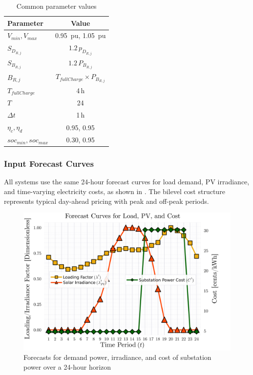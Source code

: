 \begin{table}[t]
    \centering
    \caption{Common parameter values}
    \label{table:mpopf-tradeoffs-parameters}
    \begin{tabular}{|l|c|}
    \hline
    \textbf{Parameter} & \textbf{Value} \\ \hline
    $V_{min}, V_{max}$ & 0.95\, pu, 1.05\, pu \\ \hline
    $S_{D_{R,j}}$ & $1.2 \, p_{D_{R,j}}$ \\ \hline
    $S_{B_{R,j}}$ & $1.2 \, P_{B_{R,j}}$ \\ \hline
    $B_{R,j}$ & $T_{fullCharge} \times P_{B_{R,j}}$ \\ \hline
    $T_{fullCharge}$ & 4\,h \\ \hline
    $T$ & 24 \\ \hline
    $\Delta t$ & 1\,h \\ \hline
    $\eta_c, \eta_d$ & 0.95, 0.95 \\ \hline
    $soc_{min}, soc_{max}$ & 0.30, 0.95 \\ \hline
    \end{tabular}
\end{table}

\subsubsection{Input Forecast Curves}

All systems use the same 24-hour forecast curves for load demand, PV irradiance, and time-varying electricity costs, as shown in . The bilevel cost structure represents typical day-ahead pricing with peak and off-peak periods.

\begin{figure}[t]
    \centering
    \includegraphics[height=0.25\textheight]{figures/T24-inputCurves/Horizon_24_InputForecastCurves_bilevelCosts.png}
    \caption{Forecasts for demand power, irradiance, and cost of substation power over a 24-hour horizon}
    \label{fig:mpopf-tradeoffs-input-curves}
\end{figure}

